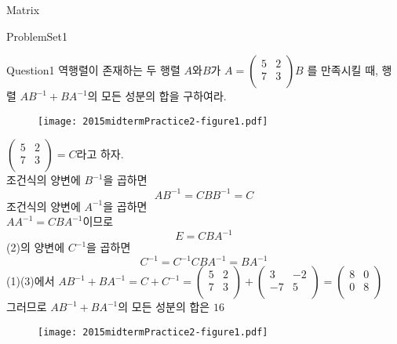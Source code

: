 
\begin{edXchapter}{Matrix}

\begin{edXsection}{ProblemSet1}

\begin{edXvertical}

\begin{edXproblem}{Question1}
역행렬이 존재하는 두 행렬 $A$와$B$가
$A = \left( \begin{array}{cc}
5 & 2 \\
7 & 3 \\
\end{array} \right)  B$ 를 만족시킬 때, 행렬 $AB^{-1}+BA^{-1}$의 모든 성분의 합을 구하여라.
\begin{figure}
	\texttt{[image: 2015midtermPractice2-figure1.pdf]}
\end{figure}


\begin{edXsolution}
$\left( \begin{array}{cc}
	5 & 2 \\
	7 & 3 \\
\end{array} \right)=C$라고 하자.\\
조건식의 양변에 $B^{-1}$을 곱하면
\begin{equation}
 AB^{-1}=CBB^{-1}=C 
\end{equation}
조건식의 양변에 $A^{-1}$을 곱하면\\
$AA^{-1}=CBA^{-1}$이므로\\
\begin{equation}
E=CBA^{-1}
\end{equation}
(2)의 양변에 $C^{-1}$을 곱하면\\
\begin{equation}
C^{-1}=C^{-1}CBA^{-1}=BA^{-1}
\end{equation}
(1)(3)에서 $AB^{-1}+BA^{-1}=C+C^{-1}=\left( \begin{array}{cc}
5 & 2 \\
7 & 3 \\
\end{array} \right)+\left( \begin{array}{cc}
3 & -2 \\
-7 & 5 \\
\end{array} \right)=\left( \begin{array}{cc}
8 & 0 \\
0 & 8 \\
\end{array} \right)$\\
그러므로 $AB^{-1}+BA^{-1}$의 모든 성분의 합은 $16$
\begin{figure}
	\texttt{[image: 2015midtermPractice2-figure1.pdf]}
\end{figure}


\end{edXsolution}
\end{edXproblem}
\end{edXvertical}
\end{edXsection}
\end{edXchapter}
